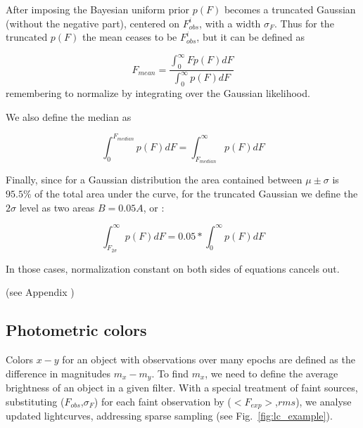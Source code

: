 \documentclass[fleqn,usenatbib]{mnras}  %
\begin{document}
 After imposing the Bayesian uniform prior $p(F)$ becomes a truncated Gaussian (without the negative part), centered on $F_{obs}^{i}$, with a width $\sigma_F$. Thus for the truncated $p(F)$  the mean ceases to be $F_{obs}^{i}$, but it can be defined as 

\begin{equation}
F_{mean} = \frac{\int _{0} ^ {\infty}{F p(F) dF}}{\int _{0} ^ {\infty}{p(F) dF}}
\end{equation} 
remembering to normalize by  integrating over the Gaussian likelihood.
 
We also define the median as  

\begin{equation}
\int _{0} ^ {F_{median}} {p(F) dF} = \int _{F_{median}} ^ {\infty} {p(F) dF}
\end{equation} 

Finally, since for a Gaussian distribution the area contained between $\mu \pm \sigma$ is $95.5 \%$ of the total area under the curve, for the truncated Gaussian we define the  $2 \sigma$ level as  two areas  $B = 0.05 A$, or : 

\begin{equation}
\int _{F_{2 \sigma}} ^{\infty} {p(F)dF} = 0.05 * \int _{0} ^{\infty} {p(F) dF} 
\end{equation}

In those cases, normalization constant on both sides of equations cancels out. 

(see Appendix )



\subsection{Photometric colors}

Colors $x-y$ for an object with observations over many epochs are defined as the difference in magnitudes $m_{x} - m_{y}$. To find $m_{x}$, we need to define the average brightness of an object in  a given filter. With a special treatment of faint sources, substituting ($F_{obs}$,$\sigma_F$) for each faint observation by ($<F_{exp}>$,$rms$), we analyse updated lightcurves, addressing sparse sampling (see Fig.~\ref{fig:lc_example}).  
\end{document}
